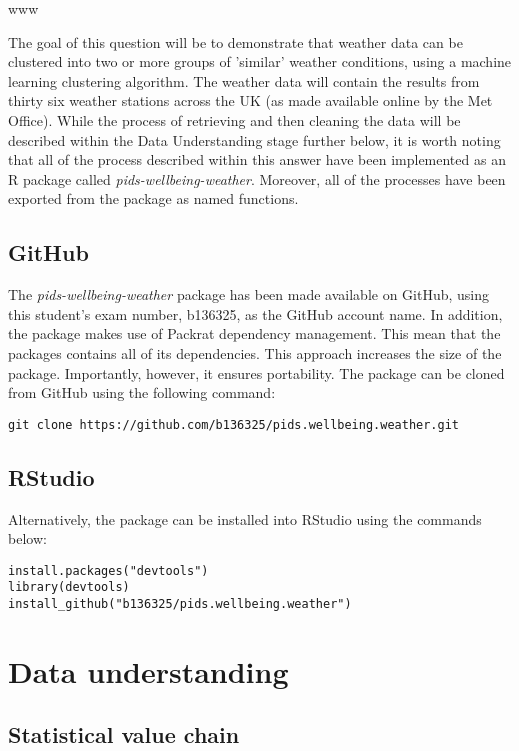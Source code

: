 www\documentclass[12pt, oneside, openany]{book}
\begin{document}
The goal of this question will be to demonstrate that weather data can be clustered into two or more groups of 'similar' weather conditions, using a machine learning clustering algorithm. The weather data will contain the results from thirty six weather stations across the UK (as made available online by the Met Office). While the process of retrieving and then cleaning the data will be described within the Data Understanding stage further below, it is worth noting that all of the process described within this answer have been implemented as an R package called \emph{pids-wellbeing-weather}. Moreover, all of the processes have been exported from the package as named functions.

\subsection*{GitHub}
The \emph{pids-wellbeing-weather} package has been made available on GitHub, using this student's exam number, b136325, as the GitHub account name. In addition, the package makes use of Packrat dependency management. This mean that the packages contains all of its dependencies. This approach increases the size of the package. Importantly, however, it ensures portability. The package can be cloned from GitHub using the following command: 


\begin{verbatim}
git clone https://github.com/b136325/pids.wellbeing.weather.git
\end{verbatim}

\subsection*{RStudio}
Alternatively, the package can be installed into RStudio using the commands below: 

\begin{verbatim}
install.packages("devtools")
library(devtools)
install_github("b136325/pids.wellbeing.weather")
\end{verbatim}

\section*{Data understanding}

\subsection*{Statistical value chain}
\end{document}
